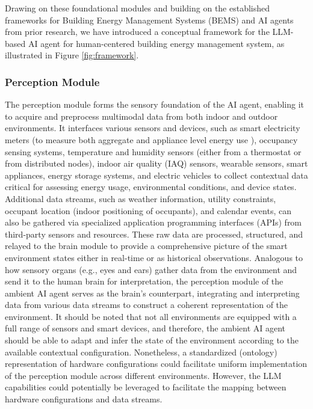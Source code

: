 \documentclass[final,3p,times]{elsarticle}
\begin{document}
Drawing on these foundational modules and building on the established frameworks for Building Energy Management Systems (BEMS) \cite{han2023home, badar2022smart, chen2017butler, manic2016building, nilsson2018smart} and AI agents \cite{guo2019review, king2023get, xu2022building, noura2020vish, ahn2023alternative, zhang2024automated} from prior research, we have introduced a conceptual framework for the LLM-based AI agent for human-centered building energy management system, as illustrated in Figure \ref{fig:framework}. 

\subsubsection{Perception Module} 
The perception module forms the sensory foundation of the AI agent, enabling it to acquire and preprocess multimodal data from both indoor and outdoor environments. It interfaces various sensors and devices, such as smart electricity meters (to measure both aggregate and appliance level energy use \cite{jazizadeh2018embed,pecanstreet}), occupancy sensing systems, temperature and humidity sensors (either from a thermostat or from distributed nodes), indoor air quality (IAQ) sensors, wearable sensors, smart appliances, energy storage systems, and electric vehicles to collect contextual data critical for assessing energy usage, environmental conditions, and device states. Additional data streams, such as weather information, utility constraints, occupant location (indoor positioning of occupants), and calendar events, can also be gathered via specialized application programming interfaces (APIs) from third-party sensors and resources. These raw data are processed, structured, and relayed to the brain module to provide a comprehensive picture of the smart environment states either in real-time or as historical observations. Analogous to how sensory organs (e.g., eyes and ears) gather data from the environment and send it to the human brain for interpretation, the perception module of the ambient AI agent serves as the brain’s counterpart, integrating and interpreting data from various data streams to construct a coherent representation of the environment. It should be noted that not all environments are equipped with a full range of sensors and smart devices, and therefore, the ambient AI agent should be able to adapt and infer the state of the environment according to the available contextual configuration. Nonetheless, a standardized (ontology) representation of hardware configurations could facilitate uniform implementation of the perception module across different environments. However, the LLM capabilities could potentially be leveraged to facilitate the mapping between hardware configurations and data streams.
\end{document}
